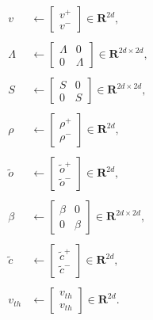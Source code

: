 \begin{enumerate}
\begin{align*}
	v &\leftarrow \begin{bmatrix}
	v^+ \\ v^-
	\end{bmatrix} 
	    \in \mathbf{R}^{2 d},
	\\
	\\
	\Lambda &\leftarrow
    \begin{bmatrix}
    \Lambda & 0 \\ 0 & \Lambda
    \end{bmatrix}
    \in \mathbf{R}^{2 d \times 2 d},
    \\
    \\
    S &\leftarrow
    \begin{bmatrix}
    S & 0 \\ 0 & S
    \end{bmatrix}
   \in \mathbf{R}^{2 d \times 2 d},\\
    \\
    \rho &\leftarrow 
    \begin{bmatrix}
    \rho^+ \\ \rho^-
    \end{bmatrix} \in \mathbf{R}^{2d},
    \\
    \\
    \tilde{o} &\leftarrow 
    \begin{bmatrix}
    \tilde{o}^+ \\ \tilde{o}^-
    \end{bmatrix} \in \mathbf{R}^{2d},
    \\
    \\
    \beta &\leftarrow 
    \begin{bmatrix}
    \beta & 0 \\ 0 & \beta
    \end{bmatrix}
    \in \mathbf{R}^{2d \times 2d},
    \\
    \\
    \tilde{c} & \leftarrow 
    \begin{bmatrix}
    \tilde{c}^+ \\ \tilde{c}^-
    \end{bmatrix} \in \mathbf{R}^{2d},
    \\
    \\
    v_{th} &\leftarrow 
    \begin{bmatrix}
    v_{th} \\ v_{th}
    \end{bmatrix} \in \mathbf{R}^{2d}.
\end{align*}


\end{enumerate}
